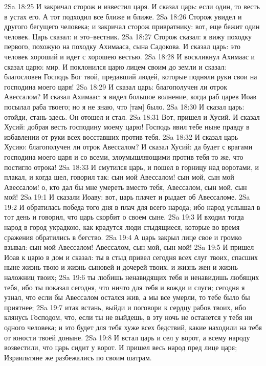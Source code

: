 2Sa 18:25  И закричал сторож и известил царя. И сказал царь: если один, то весть в устах его. А тот подходил все ближе и ближе.
2Sa 18:26  Сторож увидел и другого бегущего человека; и закричал сторож привратнику: вот, еще бежит один человек. Царь сказал: и это--вестник.
2Sa 18:27  Сторож сказал: я вижу походку первого, похожую на походку Ахимааса, сына Садокова. И сказал царь: это человек хороший и идет с хорошею вестью.
2Sa 18:28  И воскликнул Ахимаас и сказал царю: мир. И поклонился царю лицем своим до земли и сказал: благословен Господь Бог твой, предавший людей, которые подняли руки свои на господина моего царя!
2Sa 18:29  И сказал царь: благополучен ли отрок Авессалом? И сказал Ахимаас: я видел большое волнение, когда раб царев Иоав посылал раба твоего; но я не знаю, что [там] было.
2Sa 18:30  И сказал царь: отойди, стань здесь. Он отошел и стал.
2Sa 18:31  Вот, пришел и Хусий. И сказал Хусий: добрая весть господину моему царю! Господь явил тебе ныне правду в избавлении от руки всех восставших против тебя.
2Sa 18:32  И сказал царь Хусию: благополучен ли отрок Авессалом? И сказал Хусий: да будет с врагами господина моего царя и со всеми, злоумышляющими против тебя то же, что постигло отрока!
2Sa 18:33  И смутился царь, и пошел в горницу над воротами, и плакал, и когда шел, говорил так: сын мой Авессалом! сын мой, сын мой Авессалом! о, кто дал бы мне умереть вместо тебя, Авессалом, сын мой, сын мой!
2Sa 19:1  И сказали Иоаву: вот, царь плачет и рыдает об Авессаломе.
2Sa 19:2  И обратилась победа того дня в плач для всего народа; ибо народ услышал в тот день и говорил, что царь скорбит о своем сыне.
2Sa 19:3  И входил тогда народ в город украдкою, как крадутся люди стыдящиеся, которые во время сражения обратились в бегство.
2Sa 19:4  А царь закрыл лице свое и громко взывал: сын мой Авессалом! Авессалом, сын мой, сын мой!
2Sa 19:5  И пришел Иоав к царю в дом и сказал: ты в стыд привел сегодня всех слуг твоих, спасших ныне жизнь твою и жизнь сыновей и дочерей твоих, и жизнь жен и жизнь наложниц твоих;
2Sa 19:6  ты любишь ненавидящих тебя и ненавидишь любящих тебя, ибо ты показал сегодня, что ничто для тебя и вожди и слуги; сегодня я узнал, что если бы Авессалом остался жив, а мы все умерли, то тебе было бы приятнее;
2Sa 19:7  итак встань, выйди и поговори к сердцу рабов твоих, ибо клянусь Господом, что, если ты не выйдешь, в эту ночь не останется у тебя ни одного человека; и это будет для тебя хуже всех бедствий, какие находили на тебя от юности твоей доныне.
2Sa 19:8  И встал царь и сел у ворот, а всему народу возвестили, что царь сидит у ворот. И пришел весь народ пред лице царя; Израильтяне же разбежались по своим шатрам.

